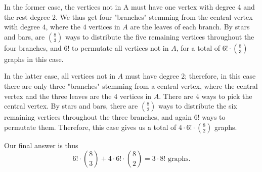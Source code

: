 \begin{solution}
In the former case, the vertices not in A must have one vertex with degree 4 and the rest degree 2. We thus get four "branches" stemming from the central vertex with degree $4$, where the $4$ vertices in $A$ are the leaves of each branch. By stars and bars, are $\binom{8}{3}$ ways to distribute the five remaining vertices throughout the four branches, and $6!$ to permutate all vertices not in $A$, for a total of $6!\cdot \binom{8}{3}$ graphs in this case.\V

In the latter case, all vertices not in $A$ must have degree $2$; therefore, in this case there are only three "branches" stemming from a central vertex, where the central vertex and the three leaves are the $4$ vertices in $A$. There are $4$ ways to pick the central vertex. By stars and bars, there are $\binom{8}{2}$ ways to distribute the six remaining vertices throughout the three branches, and again $6!$ ways to permutate them. Therefore, this case gives us a total of $4\cdot 6!\cdot \binom{8}{2}$ graphs.\V

Our final answer is thus 
\[6!\cdot \binom{8}{3} + 4\cdot 6!\cdot \binom{8}{2} = \boxed{3\cdot 8!\text{ graphs}}.\]
\end{solution}\V
